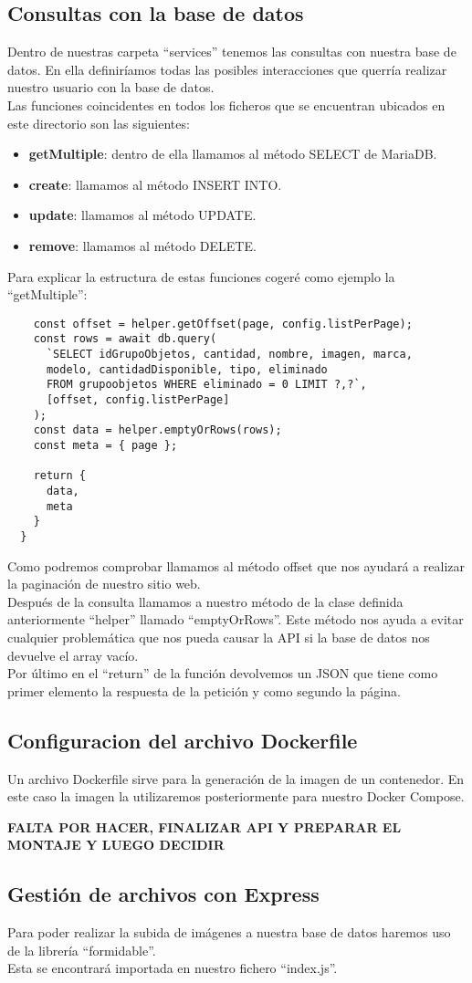 \subsection{Consultas con la base de datos}
Dentro de nuestras carpeta ``services'' tenemos las consultas con nuestra base de datos. En ella definiríamos todas las posibles interacciones que querría realizar nuestro usuario con la base de datos.
\\Las funciones coincidentes en todos los ficheros que se encuentran ubicados en este directorio son las siguientes:
\begin{itemize}
    \item \textbf{getMultiple}: dentro de ella llamamos al método SELECT de MariaDB.
    \item \textbf{create}: llamamos al método INSERT INTO.
    \item \textbf{update}: llamamos al método UPDATE.
    \item \textbf{remove}: llamamos al método DELETE.
\end{itemize}
Para explicar la estructura de estas funciones cogeré como ejemplo la ``getMultiple'':
\begin{verbatim}
    const offset = helper.getOffset(page, config.listPerPage);
    const rows = await db.query(
      `SELECT idGrupoObjetos, cantidad, nombre, imagen, marca, 
      modelo, cantidadDisponible, tipo, eliminado 
      FROM grupoobjetos WHERE eliminado = 0 LIMIT ?,?`,
      [offset, config.listPerPage]
    );
    const data = helper.emptyOrRows(rows);
    const meta = { page };
  
    return {
      data,
      meta
    }
  }
\end{verbatim}
Como podremos comprobar llamamos al método offset que nos ayudará a realizar la paginación de nuestro sitio web.
\\Después de la consulta llamamos a nuestro método de la clase definida anteriormente ``helper'' llamado ``emptyOrRows''. Este método nos ayuda a evitar cualquier problemática que nos pueda causar la API si la base de datos nos devuelve el array vacío.
\\Por último en el ``return'' de la función devolvemos un JSON que tiene como primer elemento la respuesta de la petición y como segundo la página.

\subsection{Configuracion del archivo Dockerfile}
Un archivo Dockerfile sirve para la generación de la imagen de un contenedor. En este caso la imagen la utilizaremos posteriormente para nuestro Docker Compose.

\textbf{FALTA POR HACER, FINALIZAR API Y PREPARAR EL MONTAJE Y LUEGO DECIDIR}

\subsection{Gestión de archivos con Express}
Para poder realizar la subida de imágenes a nuestra base de datos haremos uso de la librería ``formidable''.
\\Esta se encontrará importada en nuestro fichero ``index.js''.